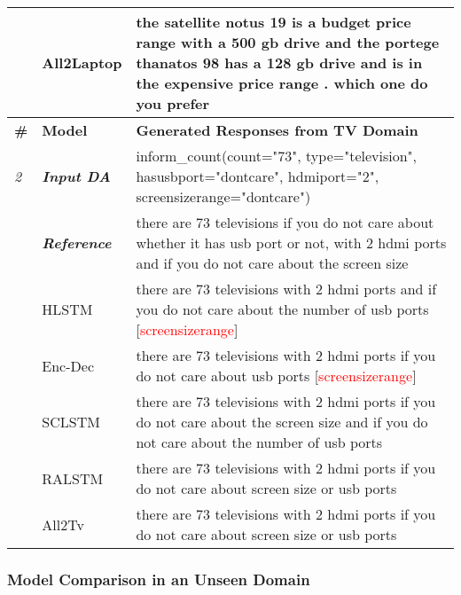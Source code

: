 \documentclass[11pt,a4paper]{article}
\begin{document}
\begin{table*}[ht]
{\begin{tabularx}{1.3\textwidth}{llX}
& All2Laptop& the satellite notus 19 is a budget price range with a 500 gb drive and the portege thanatos 98 has a 128 gb drive and is in the expensive price range . which one do you prefer \\
\hline
\textbf{\#} & \textbf{Model} & \textbf{Generated Responses from TV Domain} \\ \hline 
\textit{2} & \textbf{\textit{Input DA}} & inform\_count(count="73", type="television", hasusbport="dontcare", hdmiport="2", screensizerange="dontcare") \\
& \textbf{\textit{Reference}} & there are 73 televisions if you do not care about whether it has usb port or not, with 2 hdmi ports and if you do not care about the screen size    \\
& HLSTM & there are 73 televisions with 2 hdmi ports and if you do not care about the number of usb ports [\textcolor{red}{screensizerange}] \\
& Enc-Dec & there are 73 televisions with 2 hdmi ports if you do not care about usb ports [\textcolor{red}{screensizerange}] \\
& SCLSTM & there are 73 televisions with 2 hdmi ports if you do not care about the screen size and if you do not care about the number of usb ports \\
& RALSTM & there are 73 televisions with 2 hdmi ports if you do not care about screen size or usb ports \\ 
& All2Tv & there are 73 televisions with 2 hdmi ports if you do not care about screen size or usb ports \\
\end{tabularx}%
}
\end{table*}
\subsubsection*{Model Comparison in an Unseen Domain}
\end{document}
